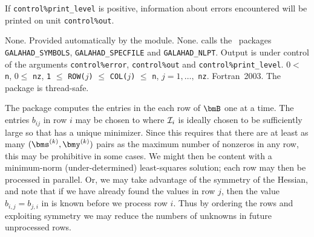 \documentclass{galahad}
\newcommand{\packagename}{SHA}
\begin{document}

\galinfo
If {\tt control\%print\_level} is positive, information about
errors encountered will be printed on unit {\tt control\-\%out}.


\galgeneral

\galcommon None.
\galworkspace Provided automatically by the module.
\galroutines None.
\galmodules {\tt \packagename\_solve} calls the \galahad\ packages
{\tt GALAHAD\_SY\-M\-BOLS},
{\tt GALAHAD\_SPECFILE} and
{\tt GALAHAD\_NLPT}.
\galio Output is under control of the arguments
 {\tt control\%error}, {\tt control\%out} and {\tt control\%print\_level}.
\galrestrictions
$0 <$ {\tt n},  $0 \le$ {\tt nz},
{\tt 1} $\le$ {\tt ROW(}$j${\tt )} $\le$ {\tt COL(}$j${\tt )} $\le$ {\tt n},
$j = 1, \ldots,$ {\tt nz}.
\galportability Fortran~2003.
The package is thread-safe.


\galmethod
The package computes the entries in the each row of $\bmB$ one at a time.
The entries $b_{ij}$ in row $i$ may be chosen to
where ${\cal I}_i$ is ideally chosen to be sufficiently large so that 
has a unique minimizer. Since this requires that there are at least
as many $(\bms^{(k)}, \bmy^{(k)})$ pairs as the maximum number of nonzeros
in any row, this may be prohibitive in some cases. We might then be content
with a minimum-norm (under-determined) least-squares solution; each row
may then be processed in parallel. Or, we may
take advantage of the symmetry of the Hessian, and note that if we
have already found the values in row $j$, then the value $b_{i,j} = b_{j,i}$
in  is known before we process row $i$. Thus by ordering the rows
and exploiting symmetry we may reduce the numbers of unknowns in
future unprocessed rows.
\end{document}
